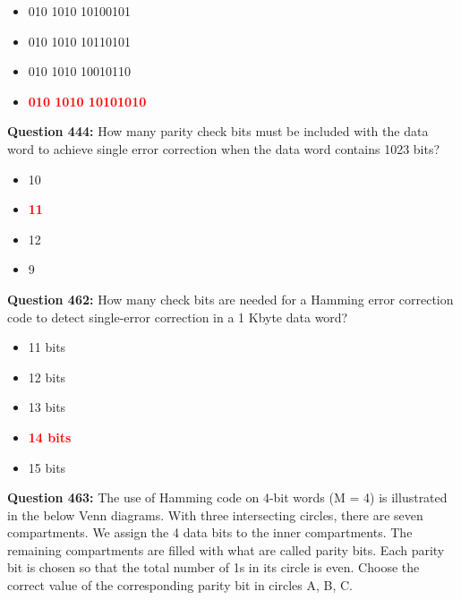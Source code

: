 \documentclass[12pt,a4paper]{article}
\begin{document}
\begin{itemize}
    \item[\textbf{A.}] 010 1010 10100101
    \item[\textbf{B.}] 010 1010 10110101
    \item[\textbf{C.}] 010 1010 10010110
    \item[\textbf{D.}] \textcolor{red}{\textbf{010 1010 10101010}}
\end{itemize}

\vspace{0.5cm}

\vspace{0.5cm}

\textbf{Question 444:} How many parity check bits must be included with the data word to achieve single error correction when the data word contains 1023 bits?

\begin{itemize}
    \item[\textbf{A.}] 10
    \item[\textbf{B.}] \textcolor{red}{\textbf{11}}
    \item[\textbf{C.}] 12
    \item[\textbf{D.}] 9
\end{itemize}

\vspace{0.5cm}

\vspace{0.5cm}

\textbf{Question 462:} How many check bits are needed for a Hamming error correction code to detect single-error correction in a 1 Kbyte data word?

\begin{itemize}
    \item[\textbf{A.}] 11 bits
    \item[\textbf{B.}] 12 bits
    \item[\textbf{C.}] 13 bits
    \item[\textbf{D.}] \textcolor{red}{\textbf{14 bits}}
    \item[\textbf{E.}] 15 bits
\end{itemize}

\vspace{0.5cm}

\vspace{0.5cm}

\textbf{Question 463:} The use of Hamming code on 4-bit words (M = 4) is illustrated in the below Venn diagrams. With three intersecting circles, there are seven compartments. We assign the 4 data bits to the inner compartments. The remaining compartments are filled with what are called parity bits. Each parity bit is chosen so that the total number of 1s in its circle is even. Choose the correct value of the corresponding parity bit in circles A, B, C.
\end{document}
